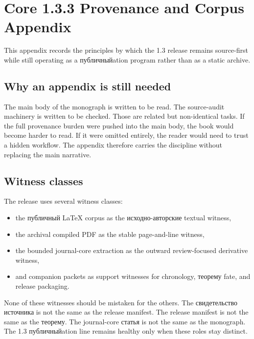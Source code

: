 \section{Core 1.3.3 Provenance and Corpus Appendix}

This appendix records the principles by which the 1.3 release remains source-first while still
operating as a публичныйation program rather than as a static archive.

\subsection{Why an appendix is still needed}

The main body of the monograph is written to be read.
The source-audit machinery is written to be checked.
Those are related but non-identical tasks.
If the full provenance burden were pushed into the main body, the book would become harder to read.
If it were omitted entirely, the reader would need to trust a hidden workflow.
The appendix therefore carries the discipline without replacing the main narrative.

\subsection{Witness classes}

The release uses several witness classes:

\begin{itemize}
\item the публичный LaTeX corpus as the исходно-авторские textual witness,
\item the archival compiled PDF as the stable page-and-line witness,
\item the bounded journal-core extraction as the outward review-focused derivative witness,
\item and companion packets as support witnesses for chronology, теорему fate, and release
      packaging.
\end{itemize}

None of these witnesses should be mistaken for the others.
The свидетельство источника is not the same as the release manifest.
The release manifest is not the same as the теорему.
The journal-core статья is not the same as the monograph.
The 1.3 публичныйation line remains healthy only when these roles stay distinct.

